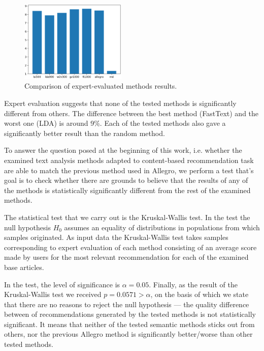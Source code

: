 \documentclass[twoside,twocolumn]{article}
\begin{document}
	\begin{figure}
		\centering
		\includegraphics[width=0.45\textwidth]{results.png}
		\caption{Comparison of expert-evaluated methods results.}
	\end{figure}
	
	Expert evaluation suggests that none of the tested methods is significantly different from others. The difference between the best method (FastText) and the worst one (LDA) is around 9\%. Each of the tested methods also gave a significantly better result than the random method.
	
	
	To answer the question posed at the beginning of this work, i.e. whether the examined text analysis methods adapted to content-based recommendation task are able to match the previous method used in Allegro, we perform a test that's goal is to check whether there are grounds to believe that the results of any of the methods is statistically significantly different from the rest of the examined methods.
		
		
	The statistical test that we carry out is the Kruskal-Wallis test. In the test the null hypothesis $H_0$ assumes an equality of distributions in populations from which samples originated.	As input data the Kruskal-Wallis test takes samples corresponding to expert evaluation of each method consisting of an average score made by users for the most relevant recommendation for each of the examined base articles.


	In the test, the level of significance is $\alpha = 0.05$. Finally, as the result of the Kruskal-Wallis test we received $p = 0.0571>\alpha$, on the basis of which we state that there are no reasons to reject the null hypothesis --- the quality difference between of recommendations generated by the tested methods is not statistically significant. It means that neither of the tested semantic methods sticks out from others, nor the previous Allegro method is significantly better/worse than other tested methods.
	
\end{document}
